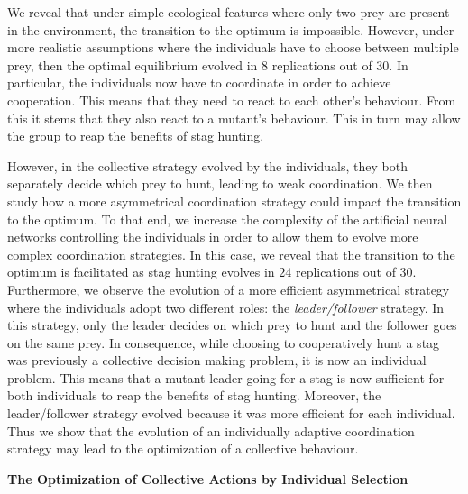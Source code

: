 We reveal that under simple ecological features where only two prey are present in the environment, the transition to the optimum is impossible. However, under more realistic assumptions where the individuals have to choose between multiple prey, then the optimal equilibrium evolved in $8$ replications out of $30$. In particular, the individuals now have to coordinate in order to achieve cooperation. This means that they need to react to each other's behaviour. From this it stems that they also react to a mutant's behaviour. This in turn may allow the group to reap the benefits of stag hunting. 

However, in the collective strategy evolved by the individuals, they both separately decide which prey to hunt, leading to weak coordination. We then study how a more asymmetrical coordination strategy could impact the transition to the optimum. To that end, we increase the complexity of the artificial neural networks controlling the individuals in order to allow them to evolve more complex coordination strategies. In this case, we reveal that the transition to the optimum is facilitated as stag hunting evolves in $24$ replications out of $30$. Furthermore, we observe the evolution of a more efficient asymmetrical strategy where the individuals adopt two different roles: the \emph{leader/follower} strategy. In this strategy, only the leader decides on which prey to hunt and the follower goes on the same prey. In consequence, while choosing to cooperatively hunt a stag was previously a collective decision making problem, it is now an individual problem. This means that a mutant leader going for a stag is now sufficient for both individuals to reap the benefits of stag hunting. Moreover, the leader/follower strategy evolved because it was more efficient for each individual. Thus we show that the evolution of an individually adaptive coordination strategy may lead to the optimization of a collective behaviour.

\clearpage

\begin{flushleft}
\textbf{\Huge The Optimization of Collective Actions by Individual Selection}
\end{flushleft}

